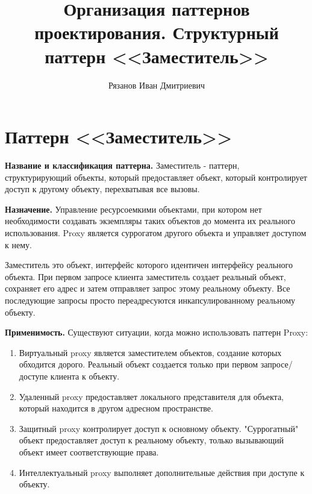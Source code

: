 \documentclass[PI,LAB]{HSEUniversity}
\title{Организация паттернов проектирования. Структурный паттерн <<Заместитель>>}
\author{Рязанов Иван Дмитриевич}
\begin{document}
\maketitle
\chapter{Паттерн <<Заместитель>>}
\textbf{Название и классификация паттерна.}
Заместитель - паттерн, структурирующий объекты, который предоставляет объект, который контролирует доступ к другому объекту, перехватывая все вызовы.

\textbf{Назначение.}
Управление ресурсоемкими объектами, при котором нет необходимости создавать экземпляры таких объектов до момента их реального использования. Proxy является суррогатом другого объекта и управляет доступом к нему.

Заместитель это объект, интерфейс которого идентичен интерфейсу реального объекта. При первом запросе клиента заместитель создает реальный объект, сохраняет его адрес и затем отправляет запрос этому реальному объекту. Все последующие запросы просто переадресуются инкапсулированному реальному объекту.

\textbf{Применимость.}
Существуют ситуации, когда можно использовать паттерн Proxy:
\begin{enumerate}
	\item Виртуальный proxy является заместителем объектов, создание которых обходится дорого. Реальный объект создается только при первом запросе/доступе клиента к объекту. 
	\item Удаленный proxy предоставляет локального представителя для объекта, который находится в другом адресном пространстве. 
	\item Защитный proxy контролирует доступ к основному объекту. "Суррогатный" объект предоставляет доступ к реальному объекту, только вызывающий объект имеет соответствующие права.
	\item Интеллектуальный proxy выполняет дополнительные действия при доступе к объекту.
\end{enumerate}
\clearpage
\end{document}
